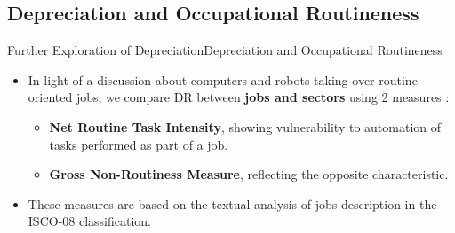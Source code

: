 \documentclass{beamer}
\begin{document}
\subsection{Depreciation and Occupational Routineness}

\begin{frame}{Further Exploration of Depreciation}{Depreciation and Occupational Routineness}
	\begin{itemize}
		\item In light of a discussion about computers and robots taking over routine-oriented jobs, we compare DR between \textbf{jobs and sectors} using 2 measures \citep{mihaylov_152._2019}:
			\begin{itemize}
				\item \textbf{Net Routine Task Intensity}, showing vulnerability to automation of tasks performed as part of a job.   
				\item \textbf{Gross Non-Routiness Measure}, reflecting the opposite characteristic.
			\end{itemize}
		\item These measures are based on the textual analysis of jobs description in the ISCO-08 classification.
	\end{itemize}
\end{frame}
\end{document}
